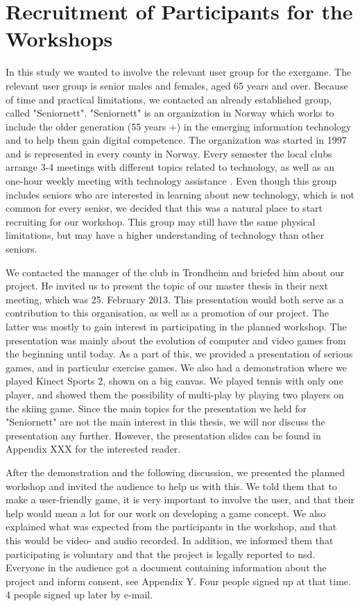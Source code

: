 \section{Recruitment of Participants for the Workshops}
In this study we wanted to involve the relevant user group for the exergame. The relevant user group is senior males and females, aged 65 years and over. Because of time and practical limitations, we contacted an already established group, called "Seniornett". "Seniornett" is an organization in Norway which works to include the older generation (55 years +) in the emerging information technology and to help them gain digital competence. The organization was started in 1997 and is represented in every county in Norway.  Every semester the local clubs arrange 3-4 meetings with different topics related to technology, as well as an one-hour weekly meeting with technology assistance \cite{seniornett}. Even though this group includes seniors who are interested in learning about new technology, which is not common for every senior, we decided that this was a natural place to start recruiting for our workshop. This group may still have the same physical limitations, but may have a higher understanding of technology than other seniors. 

We contacted the manager of the club in Trondheim and briefed him about our project. He invited us to present the topic of our master thesis in their next meeting, which was 25. February 2013. This presentation would both serve as a contribution to this organisation, as well as a promotion of our project. The latter was mostly to gain interest in participating in the planned workshop. The presentation was mainly about the evolution of computer and video games from the beginning until today. As a part of this, we provided a presentation of serious games, and in particular exercise games. We also had a demonstration where we played Kinect Sports 2, shown on a big canvas. We played tennis with only one player, and showed them the possibility of multi-play by playing two players on the skiing game. Since the main topics for the presentation we held for "Seniornett" are not the main interest in this thesis, we will nor discuss the presentation any further. However, the presentation slides can be found in Appendix XXX for the interested reader. 

After the demonstration and the following discussion, we presented the planned workshop and invited the audience to help us with this. We told them that to make a user-friendly game, it is very important to involve the user, and that their help would mean a lot for our work on developing a game concept. We also explained what was expected from the participants in the workshop, and that this would be video- and audio recorded. In addition, we informed them that participating is voluntary and that the project is legally reported to \ac{nsd}. Everyone in the audience got a document containing information about the project and inform consent, see Appendix Y. Four people signed up at that time. 4 people signed up later by e-mail.

